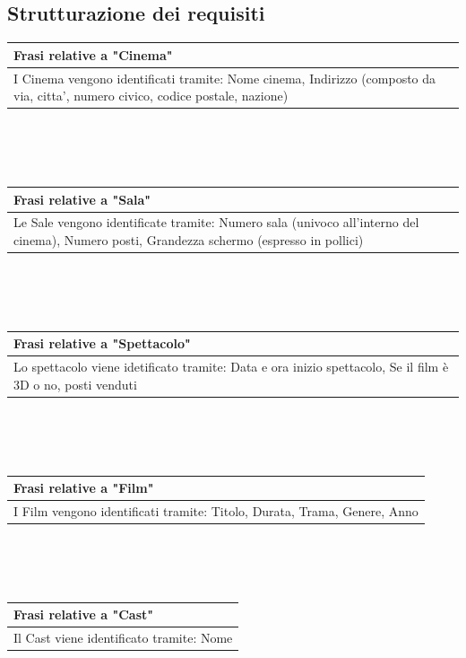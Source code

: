 \documentclass[10pt]{article}
\begin{document}
 	\subsection{Strutturazione dei requisiti}
	\begin{tabular} { |p{16.8cm}| }
 		\hline
 		\rowcolor{lightgray}
 		\textbf{Frasi relative a "Cinema"} \\
 		\hline
 		I Cinema vengono identificati tramite: Nome cinema, Indirizzo (composto da via, citta', numero civico, codice postale, nazione) \\
 		\hline 		
 	\end{tabular}
 	\\\\\\
	\begin{tabular} { |p{16.8cm}| }
	 	\hline
	 	\rowcolor{lightgray}
	 	\textbf{Frasi relative a "Sala"} \\
	 	\hline
	 	Le Sale vengono identificate tramite: Numero sala (univoco all'interno del cinema), Numero posti, Grandezza schermo (espresso in pollici) \\
	 	\hline 		
	\end{tabular} 
	\\\\\\
	\begin{tabular} { |p{16.8cm}| }
		\hline
		\rowcolor{lightgray}
		\textbf{Frasi relative a "Spettacolo"} \\
		\hline
		Lo spettacolo viene idetificato tramite: Data e ora inizio spettacolo, Se il film è 3D o no, posti venduti \\
		\hline 		
	\end{tabular} 
	\\\\\\
	\begin{tabular} { |p{16.8cm}| }
		\hline
		\rowcolor{lightgray}
		\textbf{Frasi relative a "Film"} \\
		\hline
		I Film vengono identificati tramite: Titolo, Durata, Trama, Genere, Anno \\
		\hline 		
	\end{tabular} 
 	\\\\\\
 	\begin{tabular} { |p{16.8cm}| }
 		\hline
 		\rowcolor{lightgray}
 		\textbf{Frasi relative a "Cast"} \\
 		\hline
 		Il Cast viene identificato tramite: Nome \\
 		\hline 		
 	\end{tabular} 
\end{document}
